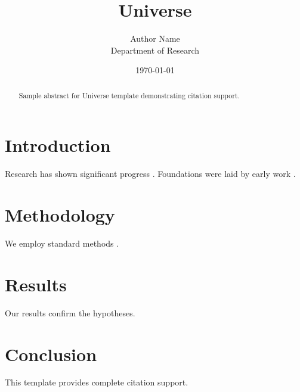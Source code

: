 \documentclass{mdpi}
\title{Universe}
\author{Author Name \\ \small Department of Research}
\date{\today}
\begin{document}
\maketitle

\begin{abstract}
Sample abstract for Universe template demonstrating citation support.
\end{abstract}

\section{Introduction}
Research has shown significant progress \citep{einstein1905}. Foundations were laid by early work \citep{turing1950}.

\section{Methodology}
We employ standard methods \citep{knuth1984}.

\section{Results}
Our results confirm the hypotheses.

\section{Conclusion}
This template provides complete citation support.



\end{document}
